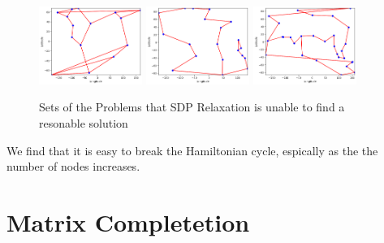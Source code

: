 \documentclass{article}
\begin{document}
\begin{figure}[!ht]
    \centering
    \includegraphics[width=0.3\textwidth]{assets/tsp-15.png}
    \includegraphics[width=0.3\textwidth]{assets/tsp-20.png}
    \includegraphics[width=0.3\textwidth]{assets/tsp-30.png}
    \caption{Sets of the Problems that SDP Relaxation is unable to find a resonable solution}
    \label{fig:TSP Graph 2}
\end{figure}


We find that it is easy to break the Hamiltonian cycle, espically as the the number of nodes increases.



\newpage 
\section{Matrix Completetion}

\end{document}
